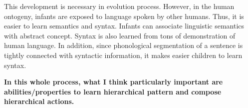 \documentclass[12pt]{article}
\begin{document}
This development is necessary in evolution process. However, in the human ontogeny, infants are 
exposed to language spoken by other humans. Thus, it is easier to learn semantics and syntax. 
Infants can associate linguistic semantics with abstract concept. Syntax is also learned from 
tons of demonstration of human language. In addition, since phonological segmentation of a sentence 
is tightly connected with syntactic information, it makes easier children to learn syntax.

\textbf{In this whole process, what I think particularly important are abilities/properties to learn hierarchical pattern 
and compose hierarchical actions.}



\end{document}
